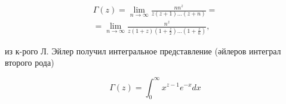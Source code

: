 \documentclass[10pt]{article}
\begin{document}
\[

\begin{gathered}

\Gamma(z)=\lim _{n \rightarrow \infty} \frac{n n^{z}}{z(z+1) \ldots(z+n)}= \\

=\lim _{n \rightarrow \infty} \frac{n^{z}}{z(1+z)\left(1+\frac{z}{2}\right) \ldots\left(1+\frac{z}{n}\right)},

\end{gathered}

\]



из к-рого Л. Эйлер получил интегральное представление (әйлеров интеграл второго рода)



\[

\Gamma(z)=\int_{0}^{\infty} x^{z-1} e^{-x} d x

\]
\end{document}
